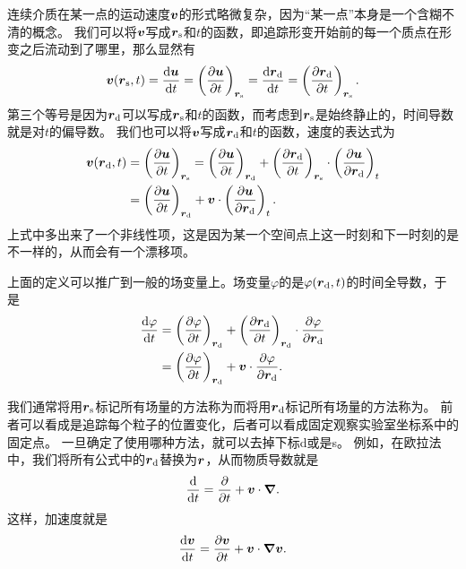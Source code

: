连续介质在某一点的运动速度$\vb*{v}$的形式略微复杂，因为“某一点”本身是一个含糊不清的概念。
我们可以将$\vb*{v}$写成$\vb*{r}_\text{s}$和$t$的函数，即追踪形变开始前的每一个质点在形变之后流动到了哪里，那么显然有
\begin{equation}
    \vb*{v}(\vb*{r}_\text{s}, t) = \dv{\vb*{u}}{t} = \left( \pdv{\vb*{u}}{t} \right)_{\vb*{r}_\text{s}} = \dv{\vb*{r}_\text{d}}{t} = \left( \pdv{\vb*{r}_\text{d}}{t} \right)_{\vb*{r}_\text{s}}.
\end{equation}
第三个等号是因为$\vb*{r}_\text{d}$可以写成$\vb*{r}_\text{s}$和$t$的函数，而考虑到$\vb*{r}_\text{s}$是始终静止的，时间导数就是对$t$的偏导数。
我们也可以将$\vb*{v}$写成$\vb*{r}_\text{d}$和$t$的函数，速度的表达式为
\begin{equation}
    \begin{aligned}
        \vb*{v}(\vb*{r}_\text{d}, t) &= \left( \pdv{\vb*{u}}{t} \right)_{\vb*{r}_\text{s}} = \left( \pdv{\vb*{u}}{t} \right)_{\vb*{r}_\text{d}} + \left( \pdv{\vb*{r}_\text{d}}{t} \right)_{\vb*{r}_\text{s}} \cdot \left( \pdv{\vb*{u}}{\vb*{r}_\text{d}} \right)_t \\
        &= \left( \pdv{\vb*{u}}{t} \right)_{\vb*{r}_\text{d}} + \vb*{v} \cdot \left(\pdv{\vb*{u}}{\vb*{r}_\text{d}}\right)_t.
    \end{aligned}
\end{equation}
上式中多出来了一个非线性项，这是因为某一个空间点上这一时刻和下一时刻的是不一样的，从而会有一个漂移项。

上面的定义可以推广到一般的场变量上。场变量$\varphi$的是$\varphi(\vb*{r}_\text{d}, t)$的时间全导数，于是
\begin{equation}
    \begin{aligned}
        \dv{\varphi}{t} &= \left( \pdv{\varphi}{t} \right)_{\vb*{r}_\text{d}} + \left( \pdv{\vb*{r}_\text{d}}{t} \right)_{\vb*{r}_\text{d}} \cdot \pdv{\varphi}{\vb*{r}_\text{d}} \\
        &= \left( \pdv{\varphi}{t} \right)_{\vb*{r}_\text{d}} + \vb*{v} \cdot \pdv{\varphi}{\vb*{r}_\text{d}}.
    \end{aligned}
\end{equation}

我们通常将用$\vb*{r}_\text{s}$标记所有场量的方法称为而将用$\vb*{r}_\text{d}$标记所有场量的方法称为。
前者可以看成是追踪每个粒子的位置变化，后者可以看成固定观察实验室坐标系中的固定点。
一旦确定了使用哪种方法，就可以去掉下标d或是s。
例如，在欧拉法中，我们将所有公式中的$\vb*{r}_\text{d}$替换为$\vb*{r}$，从而物质导数就是
\begin{equation}
    \dv{t} = \pdv{t} + \vb*{v} \cdot \grad.
\end{equation}
这样，加速度就是
\begin{equation}
    \dv{\vb*{v}}{t} = \pdv{\vb*{v}}{t} + \vb*{v} \cdot \grad{\vb*{v}}.
\end{equation}

